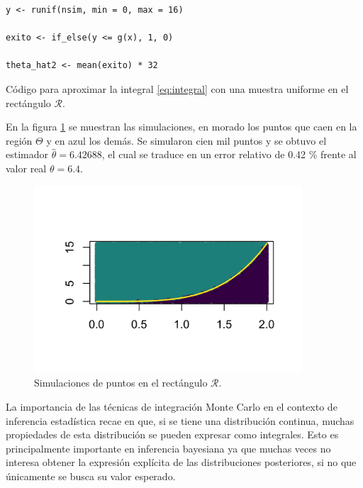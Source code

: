 \documentclass[11pt,a4paper]{article}
\begin{document}
\begin{table}[!htb]
\begin{lstlisting}
y <- runif(nsim, min = 0, max = 16)

exito <- if_else(y <= g(x), 1, 0)

theta_hat2 <- mean(exito) * 32
\end{lstlisting}
\caption{Código para aproximar la integral \eqref{eq:integral} con una muestra uniforme en el rectángulo $\mathcal{R}$.}
\label{cod:sim_hx}
\end{table}

\newpage

En la figura \ref{fig:sim_hx} se muestran las simulaciones, en morado los puntos que caen en la región $\Theta$ y en azul los demás. Se simularon cien mil puntos y se obtuvo el estimador $\hat{\theta} = 6.42688$, el cual se traduce en un error relativo de 0.42 \% frente al valor real $\theta = 6.4$.

\begin{figure}[h]
\centering\includegraphics[width=10cm]{sim_hx.png}
\caption{Simulaciones de puntos en el rectángulo $\mathcal{R}$.}
\label{fig:sim_hx}
\end{figure}

La importancia de las técnicas de integración Monte Carlo en el contexto de inferencia estadística recae en que, si se tiene una distribución continua, muchas propiedades de esta distribución se pueden expresar como integrales. Esto es principalmente importante en inferencia bayesiana ya que muchas veces no interesa obtener la expresión explícita de las distribuciones posteriores, si no que únicamente se busca su valor esperado.
\end{document}
